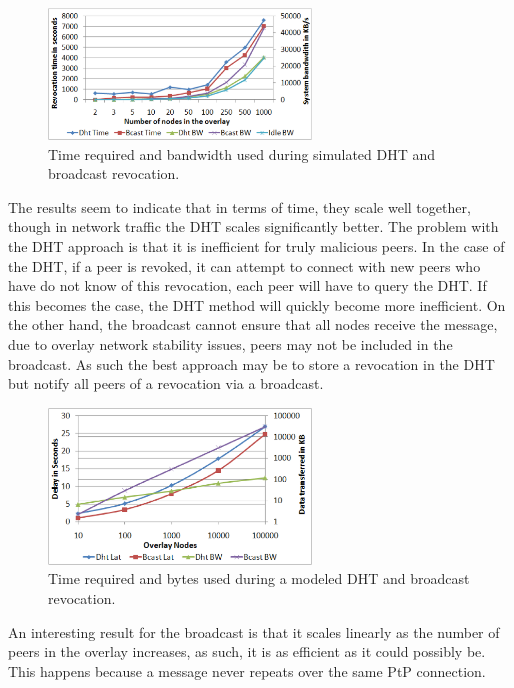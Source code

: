 \documentclass[conference]{IEEEtran}
\begin{document}
\begin{figure}[h]
\centering
\includegraphics[width=2.75in]{revocation_sim.eps}
\caption{Time required and bandwidth used during simulated DHT and broadcast
revocation.}
\label{fig:revocation_sim}
\end{figure}

The results seem to indicate that in terms of time, they scale well together,
though in network traffic the DHT scales significantly better.  The problem
with the DHT approach is that it is inefficient for truly malicious peers.
In the case of the DHT, if a peer is revoked, it can attempt to connect with
new peers who have do not know of this revocation, each peer will have to query
the DHT.  If this becomes the case, the DHT method will quickly become more
inefficient.  On the other hand, the broadcast cannot ensure that all nodes
receive the message, due to overlay network stability issues, peers may not
be included in the broadcast.  As such the best approach may be to store a
revocation in the DHT but notify all peers of a revocation via a broadcast.

\begin{figure}[h]
\centering
\includegraphics[width=2.75in]{revocation_mod.eps}
\caption{Time required and bytes used during a modeled DHT and broadcast
revocation.}
\label{fig:revocation_mod}
\end{figure}

An interesting result for the broadcast is that it scales linearly as the number
of peers in the overlay increases, as such, it is as efficient as it could
possibly be.  This happens because a message never repeats over the same PtP
connection.
\end{document}
